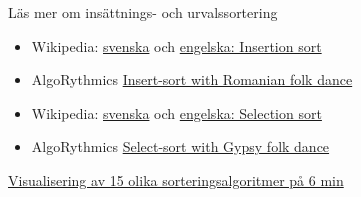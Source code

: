 \documentclass{lecturenotes}
\begin{document}
\begin{Slide}{Läs mer om insättnings- och urvalssortering}
\begin{itemize}
\item Wikipedia: \href{https://sv.wikipedia.org/wiki/Ins\%C3\%A4ttningssortering}{svenska} och 
\href{https://en.wikipedia.org/wiki/Insertion_sort}{engelska: Insertion sort} 

\item AlgoRythmics \href{https://www.youtube.com/watch?v=ROalU379l3U}{Insert-sort with Romanian folk dance  }
\end{itemize}

\vspace{2em}
\begin{itemize}

\item Wikipedia: \href{https://sv.wikipedia.org/wiki/Urvalssortering}{svenska} och 
\href{https://en.wikipedia.org/wiki/Selection_sort}{engelska: Selection sort} 

\item AlgoRythmics \href{https://www.youtube.com/watch?v=Ns4TPTC8whw}{Select-sort with Gypsy folk dance }
\end{itemize}
\vspace{2em}
\href{https://www.youtube.com/watch?v=kPRA0W1kECg}{Visualisering av 15 olika sorteringsalgoritmer på 6 min}
\end{Slide}
\end{document}
